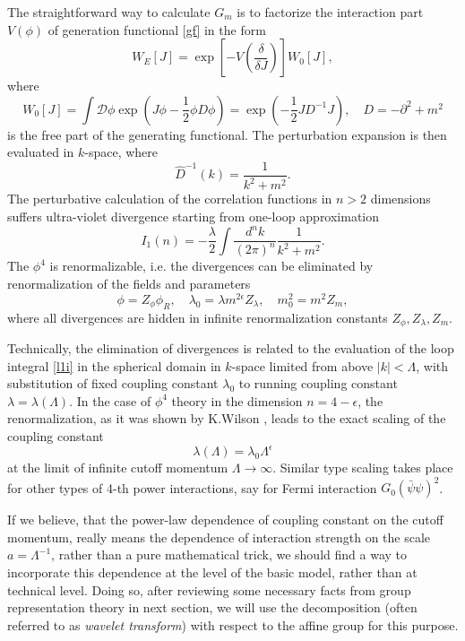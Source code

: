 \documentclass[a4paper,a4paper]{article}
\def\cD{{\mathcal D}}             %
\def\d{\partial}
\def\dk#1#2{\frac{ d^{#2}{#1} }{ (2\pi)^{#2} }} %
\begin{document}
 The straightforward way to calculate $G_m$ is to factorize the 
interaction part $V(\phi)$ of 
generation functional \eqref{gf} in the form
\begin{equation}
W_E[J] = \exp\left[-V\left(\frac{\delta}{\delta J}\right) \right] W_0[J],
\end{equation} 
where 
\begin{equation}
W_0[J] = \int \cD\phi \exp\left(J\phi - \frac{1}{2}\phi D\phi  \right) = 
\exp\left(-\frac{1}{2}JD^{-1}J \right), \quad 
D = -\d^2 +m^2\label{w0}
\end{equation}
is the free part of the generating functional.  
The perturbation expansion is then evaluated in $k$-space, where 
$$
{\widehat D}^{-1}(k) = \frac{1}{k^2+m^2}.
$$
The perturbative calculation of the correlation functions in $n>2$ dimensions 
suffers ultra-violet divergence starting from one-loop approximation
\begin{equation}
I_1(n) = -\frac{\lambda}{2} \int \dk{k}{n}\frac{1}{k^2+m^2}. 
\label{l1i}
\end{equation}
The $\phi^4$ is renormalizable, i.e. the divergences can be eliminated by 
renormalization of the fields and parameters 
\begin{equation}
\phi = Z_\phi \phi_R, \quad \lambda_0 = \lambda m^{2\epsilon}Z_\lambda,\quad 
m_0^2 = m^2 Z_m,
\end{equation} 
where all divergences are hidden in infinite renormalization 
constants $Z_\phi, Z_\lambda, Z_m$. 

Technically, the elimination of divergences is related to the evaluation 
of the loop integral \eqref{l1i} in the spherical domain in $k$-space 
limited from 
above $|k|<\Lambda$, with substitution of fixed coupling 
constant $\lambda_0$ to running coupling constant $\lambda=\lambda(\Lambda)$.
In the case of $\phi^4$ theory in the dimension 
$n=4-\epsilon$, the renormalization, as it was 
shown by K.Wilson \cite{Wilson1973}, leads to the exact scaling of the coupling constant 
\begin{equation}
\lambda(\Lambda) = \lambda_0 \Lambda^\epsilon
\label{ws}
\end{equation}
at the limit of infinite cutoff momentum $\Lambda\to\infty$. 
Similar type scaling takes place for other types of 4-th power 
interactions, say for Fermi interaction 
$G_0 (\bar\psi \psi)^2$. 

If we believe, that the power-law dependence of coupling constant 
on the cutoff 
momentum, really means the dependence of interaction strength on the 
scale $a=\Lambda^{-1}$, rather than a pure mathematical trick, we should 
find a way to incorporate this dependence at the level of the basic model, 
rather than at technical level. Doing so, after reviewing some necessary 
facts from group representation theory in next section, we will use 
the decomposition (often referred to as {\em wavelet transform}) with 
respect to the affine group  for this purpose.  
\end{document}
